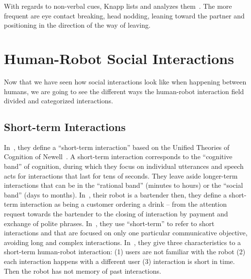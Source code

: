 \documentclass[a4paper,11pt,twoside]{StyleThese}
\begin{document}
With regards to non-verbal cues,  Knapp \etal{} lists and analyzes them~\cite{knapp_1973_rhetoric}. The more frequent are eye contact breaking,  head nodding, leaning toward the partner and positioning in the direction of the way of leaving.

\section{Human-Robot Social Interactions}

Now that we have seen how social interactions look like when happening between humans, we are going to see the different ways the human-robot interaction field divided and categorized interactions. 

\subsection{Short-term Interactions}
In~\cite{zheng_2013_designing}, they define a ``short-term interaction'' based on the Unified Theories of Cognition of Newell~\cite{newell_1994_unified}. A short-term interaction corresponds to the ``cognitive band'' of cognition, during which they focus on individual utterances and speech acts for interactions that last for tens of seconds. They leave aside longer-term interactions that can be in the ``rational band'' (minutes to hours) or the ``social band'' (days to months).
In~\cite{gaschler_2012_modelling}, their robot is a bartender then, they define a short-term interaction as being a customer ordering a drink – from the attention request towards the bartender to the closing of interaction by payment and exchange of polite phrases.
In~\cite{iocchi_2015_personalized}, they use ``short-term'' to refer to short interactions and that are focused on only one particular communicative objective, avoiding long and complex interactions.
In~\cite{sanelli_2017_short}, they give three characteristics to a short-term human-robot interaction: (1) users are not familiar with the robot (2) each interaction happens with a different user (3) interaction is short in time. Then the robot has not memory of past interactions.
\end{document}
